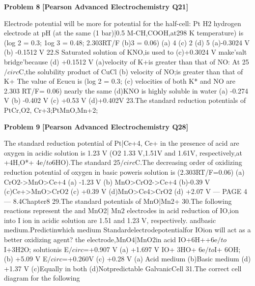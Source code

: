 \begin{problembox}
\textbf{Problem 8} \hfill \textbf{[Pearson Advanced Electrochemistry Q21]}
\label{q:ext-pearson-8}

Electrode potential will be more for
potential for the half-cell: Pt  H2
hydrogen electrode at pH (at the same
(1 bar)|0.5 M-CH,COOH,at298 K
temperature)
is (log 2 = 0.3; 1og 3 = 0.48; 2.303RT/F
(b)3
= 0.06)
(a) 4
(c) 2
(d) 5
(a)-0.3024 V
(b) -0.1512 V
22.S
Saturated solution of KNO,is used to
(c)+0.3024 V
make'salt bridge'because
(d) +0.1512 V
(a)velocity of K+is greater than that of
NO:
At 25$/circ$C,the solubility product of CuCl
(b) velocity of NO;is greater than that
of K+
The value of Ecucu
is (log 2 = 0.3;
(c) velocities of both K* and NO are
2.303 RT/F= 0.06)
nearly the same
(d)KNO is highly soluble in water
(a) -0.274 V
(b) -0.402 V
(c) +0.53 V
(d)+0.402V
23.The standard reduction
potentials
of PtCr,O$2$, Cr+3;PtMnO,Mn+2;
\end{problembox}

\begin{problembox}
\textbf{Problem 9} \hfill \textbf{[Pearson Advanced Electrochemistry Q28]}
\label{q:ext-pearson-9}

The standard reduction potential of
Pt|Ce+4, Ce+ in the presence of acid are
oxygen in acidic solution is 1.23 V (O2
1.33 V,1.51V and 1.61V, respectively,at
+4H,O*+ 4e$/to$6HO).The standard
25$/circ$C.The decreasing order of oxidizing
reduction potential of oxygen in basic
poweris
solution is (2.303RT/F=0.06)
(a) CrO$2$->MnO>Ce+4
(a) -1.23 V
(b) MnO>CrO$2$->Ce+4
(b)-0.39 V
(c)Ce+>MnO>CrO$2$
(c) +0.39 V
(d)MnO>Ce4>CrO$2$
(d) +2.07 V
--- PAGE 4 ---
8.4Chapter8
29.The standard potentials of MnO|Mn$2$+
30.The following reactions represent the
and MnO2| Mn$2$ electrodes in acid
reduction of IO,ion into I ion in acidic
solution are 1.51 and 1.23 V, respectively.
andbasic medium.Predictinwhich medium
Standardelectrodepotentialfor
IOion will act as a better oxidizing agent?
the electrode,MnO4|MnO2in acid
IO+6H++6e$/to$I+3H2O; 
solutionis
E$/circ$=+0.907 V
(a) +1.697 V
IO+ 3HO+ 6e$/to$I+ 6OH;
(b) +5.09 V
E$/circ$=+0.260V
(c) +0.28 V
(a) Acid medium
(b)Basic medium
(d) +1.37 V
(c)Equally in both
(d)Notpredictable
GalvanicCell
31.The correct cell diagram for the following
\end{problembox}

